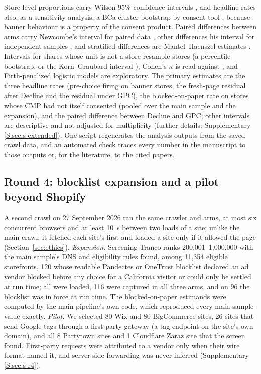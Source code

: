 Store-level proportions carry Wilson 95\% confidence intervals \citep{wilson1927probable}, and headline rates also, as a sensitivity analysis, a BCa cluster bootstrap by consent tool \citep{field2007bootstrapping}, because banner behaviour is a property of the consent product. Paired differences between arms carry Newcombe's interval for paired data \citep{newcombe1998paired}, other differences his interval for independent samples \citep{newcombe1998independent}, and stratified differences are Mantel--Haenszel estimates \citep{mantel1959statistical}. Intervals for shares whose unit is not a store resample stores (a percentile bootstrap, or the Korn--Graubard interval \citep{korn1998survey}), Cohen's $\kappa$ \citep{cohen1960kappa} is read against \citet{landis1977agreement}, and Firth-penalized logistic models \citep{firth1993bias,heinze2002separation} are exploratory. The primary estimates are the three headline rates (pre-choice firing on banner stores, the fresh-page residual after Decline and the residual under GPC), the blocked-on-paper rate on stores whose CMP had not itself consented (pooled over the main sample and the expansion), and the paired difference between Decline and GPC; other intervals are descriptive and not adjusted for multiplicity (further details: Supplementary \ref*{S:sec:s-extended}). One script regenerates the analysis outputs from the saved crawl data, and an automated check traces every number in the manuscript to those outputs or, for the literature, to the cited papers.

\subsection{Round 4: blocklist expansion and a pilot beyond Shopify}\label{sec:method-r4}

A second crawl on 27 September 2026 ran the same crawler and arms, at most six concurrent browsers and at least 10~s between two loads of a site; unlike the main crawl, it fetched each site's  first and loaded a site only if it allowed the page (Section~\ref{sec:ethics}). \emph{Expansion.} Screening Tranco ranks 200,001--1,000,000 with the main sample's DNS and eligibility rules found, among 11,354 eligible storefronts, 120 whose readable Pandectes or OneTrust blocklist declared an ad vendor blocked before any choice for a California visitor or could only be settled at run time; all were loaded, 116 were captured in all three arms, and on 96 the blocklist was in force at run time. The blocked-on-paper estimands were computed by the main pipeline's own code, which reproduced every main-sample value exactly. \emph{Pilot.} We selected 80 Wix and 80 BigCommerce sites, 26 sites that send Google tags through a first-party gateway (a tag endpoint on the site's own domain), and all 8 Partytown sites and 1 Cloudflare Zaraz site that the screen found. First-party requests were attributed to a vendor only when their wire format named it, and server-side forwarding was never inferred (Supplementary \ref*{S:sec:s-r4}).

